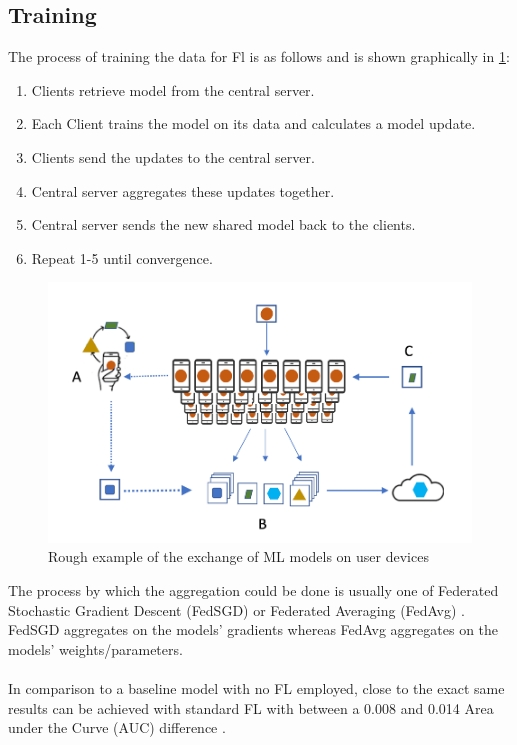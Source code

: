 \subsection{Training}
The process of training the data for Fl is as follows and is shown graphically in \ref{fig:federated_learning}:
\begin{enumerate}
    \item Clients retrieve model from the central server.
    
    \item Each Client trains the model on its data and calculates a model update.
    
    \item Clients send the updates to the central server.
    
    \item Central server aggregates these updates together.
    
    \item Central server sends the new shared model back to the clients.
    
    \item Repeat 1-5 until convergence.
\end{enumerate}
\begin{figure}[htbp]
	\centering
    \includegraphics[scale=0.3]{background/federated_learning.png}
	\caption{Rough example of the exchange of ML models on user devices \cite{federated_learning}}
	\label{fig:federated_learning}
\end{figure}
The process by which the aggregation could be done is usually one of Federated Stochastic Gradient Descent (FedSGD) \cite{fedsgd} or Federated Averaging (FedAvg) \cite{fedavg}.
FedSGD aggregates on the models' gradients whereas FedAvg aggregates on the models' weights/parameters. \\ \\
In comparison to a baseline model with no FL employed, close to the exact same results can be achieved with standard FL with between a 0.008 and 0.014 Area under the Curve (AUC) difference \cite{babu}.



